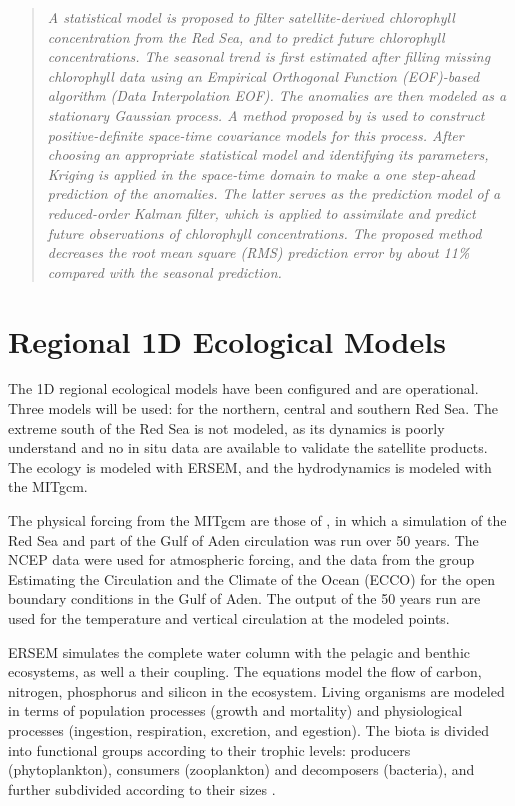 \begin{quotation}
\emph{A statistical model is proposed to filter satellite-derived chlorophyll
concentration from the Red Sea, and to predict future chlorophyll
concentrations. The seasonal trend is first estimated after filling missing
chlorophyll data using an Empirical Orthogonal Function (EOF)-based algorithm
(Data Interpolation EOF). The anomalies are then modeled as a stationary
Gaussian process. A method proposed by \citet{Gneiting2002} is used to
construct positive-definite space-time covariance models for this process.
After choosing an appropriate statistical model and identifying its parameters,
Kriging is applied in the space-time domain to make a one step-ahead prediction
of the anomalies. The latter serves as the prediction model of a reduced-order
Kalman filter, which is applied to assimilate and predict future observations
of chlorophyll concentrations. The proposed method decreases the root mean
square (RMS) prediction error by about 11\% compared with the seasonal
prediction.}
\end{quotation}

\section{Regional 1D Ecological Models}

The 1D regional ecological models have been configured and
are operational. Three models will be used: for the northern, central and
southern Red Sea. The extreme south of the Red Sea is not modeled, as its
dynamics is poorly understand and no in situ data are available to validate the
satellite products. The ecology is modeled with ERSEM, and the hydrodynamics
is modeled with the MITgcm.

The physical forcing from the MITgcm are those of \citet{Yao2014, Yao2014b}, in
which a simulation of the Red Sea and part of the Gulf of Aden circulation was
run over 50 years. The NCEP data were used for atmospheric forcing, and the
data from the group Estimating the Circulation and the Climate of the Ocean
(ECCO) for the open boundary conditions in the Gulf of Aden. The output of the
50 years run are used for the temperature and vertical circulation at the
modeled points.

ERSEM simulates the complete water column with the pelagic and benthic
ecosystems, as well a their coupling. The equations model the flow of carbon,
nitrogen, phosphorus and silicon in the ecosystem. Living organisms are modeled
in terms of population processes (growth and mortality) and physiological
processes (ingestion, respiration, excretion, and egestion). The biota is
divided into functional groups according to their trophic levels: producers
(phytoplankton), consumers (zooplankton) and decomposers (bacteria), and
further subdivided according to their sizes \citep{Baretta1995}.

